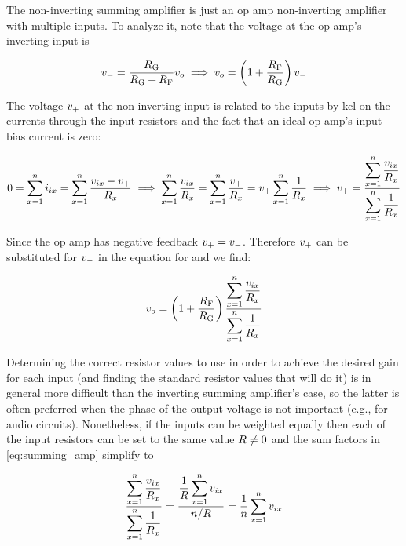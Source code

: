 The non-inverting summing amplifier is just an op amp non-inverting amplifier with multiple inputs.
To analyze it, note that the voltage at the op amp's inverting input is

\begin{equation*}
v\sub{-} = \frac{\R[G]}{\R[G] + \R[F]}\vout \implies \vout = \left(1 + \frac{\R[F]}{\R[G]}\right)v\sub{-}
\end{equation*}

The voltage \(v_\mathrm{+}\) at the non-inverting input is related to the inputs by \ac{kcl} on the currents through the input resistors and the fact that an ideal op amp's input bias current is zero:

\begin{equation*}
	0 = \sum_{x=1}^{n}\iin[x] = \sum_{x=1}^{n}\frac{\vin[x] - v\sub{+}}{R_x} \implies \sum_{x=1}^{n}\frac{\vin[x]}{R_x} = \sum_{x=1}^{n}\frac{v\sub{+}}{R_x} = v\sub{+}\sum_{x=1}^{n}\frac{1}{R_x} \implies v\sub{+} = \frac{\displaystyle\sum_{x=1}^{n}\frac{\vin[x]}{R_x}}{\displaystyle\sum_{x=1}^{n}\frac{1}{R_x}}
\end{equation*}

Since the op amp has negative feedback \(v_\mathrm{+} = v_\mathrm{-}\).
Therefore \(v_\mathrm{+}\) can be substituted for \(v_\mathrm{-}\) in the equation for \vout and we find:

\begin{equation}
	\vout = \left(1 + \frac{\R[F]}{\R[G]}\right)\frac{\displaystyle\sum_{x=1}^{n}\frac{\vin[x]}{R_x}}{\displaystyle\sum_{x=1}^{n}\frac{1}{R_x}}
	\label{eq:summing_amp}
\end{equation}

Determining the correct resistor values to use in order to achieve the desired gain for each input (and finding the standard resistor values that will do it) is in general more difficult than the inverting summing amplifier's case, so the latter is often preferred when the phase of the output voltage is not important (e.g., for audio circuits).
Nonetheless, if the inputs can be weighted equally then each of the input resistors can be set to the same value \(\R \neq 0\) and the sum factors in \eqref{eq:summing_amp} simplify to

\begin{equation*}
	\frac{\displaystyle\sum_{x=1}^{n}\frac{\vin[x]}{R_x}}{\displaystyle\sum_{x=1}^{n}\frac{1}{R_x}} = \frac{\displaystyle\frac{1}{R}\sum_{x=1}^{n}\vin[x]}{n/R} = \frac{1}{n}\sum_{x=1}^{n}\vin[x]
\end{equation*}

